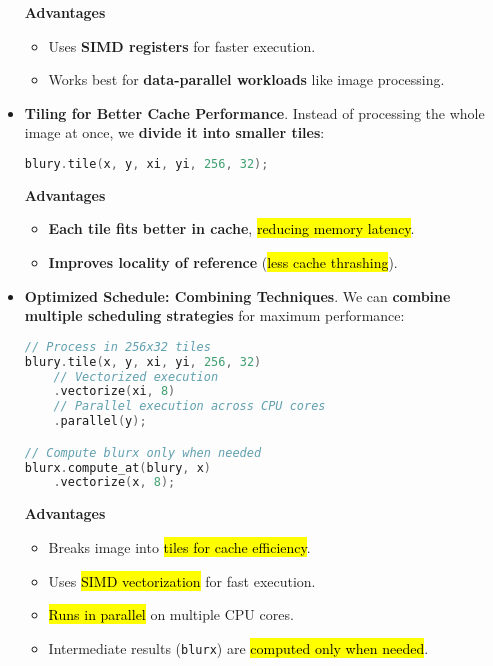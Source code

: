 \begin{itemize}
    \begin{flushleft}
        \textcolor{Green3}{ \textbf{Advantages}}
    \end{flushleft}
    \begin{itemize}[label=\textcolor{Green3}{}]
        \item Uses \textbf{SIMD registers} for faster execution.
        \item Works best for \textbf{data-parallel workloads} like image processing.
    \end{itemize}


    \item[\textcolor{Red2}{\faIcon{\speedIcon}}] \textcolor{Red2}{\textbf{Tiling for Better Cache Performance}}. Instead of processing the whole image at once, we \textbf{divide it into smaller tiles}:
    \begin{lstlisting}[language=c++]
blury.tile(x, y, xi, yi, 256, 32);\end{lstlisting}

    \begin{flushleft}
        \textcolor{Green3}{ \textbf{Advantages}}
    \end{flushleft}
    \begin{itemize}[label=\textcolor{Green3}{}]
        \item \textbf{Each tile fits better in cache}, \hl{reducing memory latency}.
        \item \textbf{Improves locality of reference} (\hl{less cache thrashing}).
    \end{itemize}


    \item[\textcolor{Red2}{\faIcon{\speedIcon}}] \textcolor{Red2}{\textbf{Optimized Schedule: Combining Techniques}}. We can \textbf{combine multiple scheduling strategies} for maximum performance:
    \begin{lstlisting}[language=c++]
// Process in 256x32 tiles
blury.tile(x, y, xi, yi, 256, 32)
    // Vectorized execution
    .vectorize(xi, 8)
    // Parallel execution across CPU cores
    .parallel(y);

// Compute blurx only when needed
blurx.compute_at(blury, x)
    .vectorize(x, 8);\end{lstlisting}

    \begin{flushleft}
        \textcolor{Green3}{ \textbf{Advantages}}
    \end{flushleft}
    \begin{itemize}[label=\textcolor{Green3}{}]
        \item Breaks image into \hl{tiles for cache efficiency}.
        \item Uses \hl{SIMD vectorization} for fast execution.
        \item \hl{Runs in parallel} on multiple CPU cores.
        \item Intermediate results (\texttt{blurx}) are \hl{computed only when needed}.
    \end{itemize}
\end{itemize}

